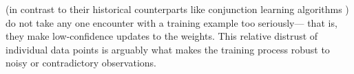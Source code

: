 \begin{example}
{		(in contrast to their historical counterparts like conjunction learning algorithms \parencite{conjunctions})
	do not take any one encounter with a training example too seriously---
	\unskip that is, they make low-confidence updates to the weights.
	This relative distrust of individual data points is arguably what makes the training process robust to noisy or contradictory observations.
}%


\end{example}

